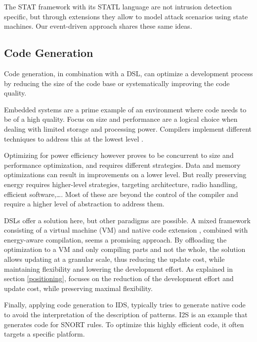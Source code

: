 \documentclass[conference]{IEEEtran}
\begin{document}
The STAT framework with its STATL language
\cite{eckmann2002statl,vigna2003designing} are not intrusion detection
specific, but through extensions they allow to model attack scenarios using
state machines. Our event-driven approach shares these same ideas.

\subsection{Code Generation}

Code generation, in combination with a DSL, can optimize a development process
by reducing the size of the code base or systematically improving the code
quality.

Embedded systems are a prime example of an environment where code needs to be
of a high quality. Focus on size and performance are a logical choice when
dealing with limited storage and processing power. Compilers implement
different techniques to address this at the lowest level
\cite{marwedel2002code}.

Optimizing for power efficiency however proves to be concurrent to size and
performance optimization, and requires different strategies. Data and memory
optimizations \cite{panda2001data} can result in improvements on a lower level.
But really preserving energy requires higher-level strategies, targeting
architecture, radio handling, efficient software,\dots \cite{naik2001software}.
Most of these are beyond the control of the compiler and require a higher level
of abstraction to address them.

DSLs offer a solution here, but other paradigms are possible. A mixed framework
consisting of a virtual machine (VM) and native code extension
\cite{sadilek2007energy}, combined with energy-aware compilation, seems a
promising approach. By offloading the optimization to a VM and only compiling
parts and not the whole, the solution allows updating at a granular scale, thus
reducing the update cost, while maintaining flexibility and lowering the
development effort. As explained in section \ref{positioning}, \NAME focuses on
the reduction of the development effort and update cost, while preserving
maximal flexibility.

Finally, applying code generation to IDS, typically tries to generate native
code to avoid the interpretation of the description of patterns.
I2S \cite{charitakis2003code} is an example that generates code for
SNORT \cite{roesch1999snort} rules. To optimize this highly efficient code, it
often targets a specific platform.
\end{document}

